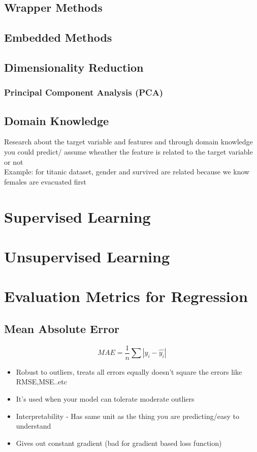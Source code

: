 \documentclass[12pt]{extarticle}
\begin{document}
\subsection{Wrapper Methods}

\subsection{Embedded Methods}

\subsection{Dimensionality Reduction}
\subsubsection{Principal Component Analysis (PCA)}

\subsection{Domain Knowledge}
Research about the target variable and features and through domain
knowledge you could predict/ assume wheather the feature is related 
to the target variable or not \\
Example: for titanic dataset, gender and survived are related because
we know females are evacuated first

\section{Supervised Learning}
\section{Unsupervised Learning}

\section{Evaluation Metrics for Regression}

\subsection{Mean Absolute Error}  

$$MAE = \frac{1}{n}\sum{|y_i - \hat{y_i}|}$$ 
\begin{itemize}
    \item Robust to outliers, treats all errors equally doesn’t square the errors like RMSE,MSE..etc 
    \item It’s used when your model can tolerate moderate outliers  
    \item Interpretability - Has same unit as the thing you are predicting/easy to understand 
    \item Gives out constant gradient (bad for gradient based loss function) 
\end{itemize}
 
\end{document}

